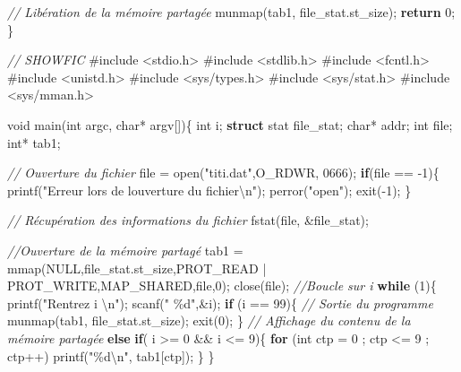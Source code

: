 \documentclass[
]{article}
\newenvironment{Shaded}{}{}
\newcommand{\BaseNTok}[1]{\textcolor[rgb]{0.25,0.63,0.44}{#1}}
\newcommand{\CommentTok}[1]{\textcolor[rgb]{0.38,0.63,0.69}{\textit{#1}}}
\newcommand{\ControlFlowTok}[1]{\textcolor[rgb]{0.00,0.44,0.13}{\textbf{#1}}}
\newcommand{\DataTypeTok}[1]{\textcolor[rgb]{0.56,0.13,0.00}{#1}}
\newcommand{\DecValTok}[1]{\textcolor[rgb]{0.25,0.63,0.44}{#1}}
\newcommand{\ImportTok}[1]{#1}
\newcommand{\KeywordTok}[1]{\textcolor[rgb]{0.00,0.44,0.13}{\textbf{#1}}}
\newcommand{\NormalTok}[1]{#1}
\newcommand{\PreprocessorTok}[1]{\textcolor[rgb]{0.74,0.48,0.00}{#1}}
\newcommand{\SpecialCharTok}[1]{\textcolor[rgb]{0.25,0.44,0.63}{#1}}
\newcommand{\StringTok}[1]{\textcolor[rgb]{0.25,0.44,0.63}{#1}}
\begin{document}
\begin{Shaded}
\begin{Highlighting}[]
    \CommentTok{// Libération de la mémoire partagée}
\NormalTok{    munmap(tab1, file\_stat.st\_size);}
    \ControlFlowTok{return} \DecValTok{0}\NormalTok{;}
\NormalTok{\}}

\CommentTok{// SHOWFIC}
\PreprocessorTok{\#include }\ImportTok{\textless{}stdio.h\textgreater{}}
\PreprocessorTok{\#include }\ImportTok{\textless{}stdlib.h\textgreater{}}
\PreprocessorTok{\#include }\ImportTok{\textless{}fcntl.h\textgreater{}}
\PreprocessorTok{\#include }\ImportTok{\textless{}unistd.h\textgreater{}}
\PreprocessorTok{\#include }\ImportTok{\textless{}sys/types.h\textgreater{}}
\PreprocessorTok{\#include }\ImportTok{\textless{}sys/stat.h\textgreater{}}
\PreprocessorTok{\#include }\ImportTok{\textless{}sys/mman.h\textgreater{}}


\DataTypeTok{void}\NormalTok{ main(}\DataTypeTok{int}\NormalTok{ argc, }\DataTypeTok{char}\NormalTok{* argv[])\{}
    \DataTypeTok{int}\NormalTok{ i;}
    \KeywordTok{struct}\NormalTok{ stat file\_stat;}
    \DataTypeTok{char}\NormalTok{* addr;}
    \DataTypeTok{int}\NormalTok{ file;}
    \DataTypeTok{int}\NormalTok{* tab1;}

    \CommentTok{// Ouverture du fichier}
\NormalTok{    file = open(}\StringTok{"titi.dat"}\NormalTok{,O\_RDWR, }\BaseNTok{0666}\NormalTok{);}
    \ControlFlowTok{if}\NormalTok{(file == {-}}\DecValTok{1}\NormalTok{)\{}
\NormalTok{        printf(}\StringTok{"Erreur lors de l\textquotesingle{}ouverture du fichier}\SpecialCharTok{\textbackslash{}n}\StringTok{"}\NormalTok{);}
\NormalTok{        perror(}\StringTok{"open"}\NormalTok{);}
\NormalTok{        exit({-}}\DecValTok{1}\NormalTok{);}
\NormalTok{    \}}
    
    \CommentTok{// Récupération des informations du fichier}
\NormalTok{    fstat(file, \&file\_stat);}

    \CommentTok{//Ouverture de la mémoire partagé}
\NormalTok{    tab1 = mmap(NULL,file\_stat.st\_size,PROT\_READ | PROT\_WRITE,MAP\_SHARED,file,}\DecValTok{0}\NormalTok{);}
\NormalTok{    close(file);}
    \CommentTok{//Boucle sur i}
    \ControlFlowTok{while}\NormalTok{ (}\DecValTok{1}\NormalTok{)\{}
\NormalTok{        printf(}\StringTok{"Rentrez i }\SpecialCharTok{\textbackslash{}n}\StringTok{"}\NormalTok{);}
\NormalTok{        scanf(}\StringTok{" \%d"}\NormalTok{,\&i);}
        \ControlFlowTok{if}\NormalTok{ (i == }\DecValTok{99}\NormalTok{)\{}
            \CommentTok{// Sortie du programme}
\NormalTok{            munmap(tab1, file\_stat.st\_size);}
\NormalTok{            exit(}\DecValTok{0}\NormalTok{);}
\NormalTok{        \}}
        \CommentTok{// Affichage du contenu de la mémoire partagée}
        \ControlFlowTok{else} \ControlFlowTok{if}\NormalTok{( i \textgreater{}= }\DecValTok{0}\NormalTok{ \&\& i \textless{}= }\DecValTok{9}\NormalTok{)\{}
            \ControlFlowTok{for}\NormalTok{ (}\DataTypeTok{int}\NormalTok{ ctp = }\DecValTok{0}\NormalTok{ ; ctp \textless{}= }\DecValTok{9}\NormalTok{ ; ctp++)}
\NormalTok{                printf(}\StringTok{"\%d}\SpecialCharTok{\textbackslash{}n}\StringTok{"}\NormalTok{, tab1[ctp]);}
\NormalTok{        \}}
\NormalTok{    \}}
    

\end{Highlighting}
\end{Shaded}
\end{document}
